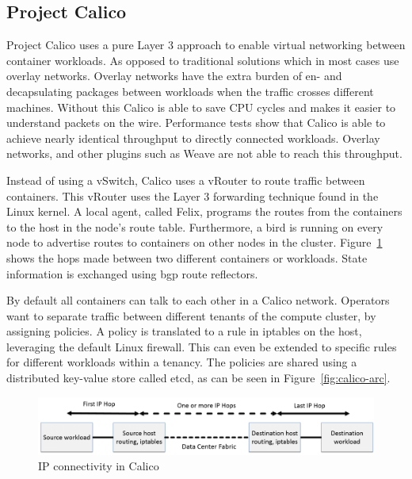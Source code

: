 \subsection{Project Calico}
Project Calico uses a pure Layer 3 approach to enable virtual networking between container workloads. As opposed to traditional solutions which in most cases use overlay networks. Overlay networks have the extra burden of en- and decapsulating packages between workloads when the traffic crosses different machines. Without this Calico is able to save CPU cycles and makes it easier to understand packets on the wire. Performance tests\cite{dzone, dataplane, chunqi} show that Calico is able to achieve nearly identical throughput to directly connected workloads. Overlay networks, and other plugins such as Weave\cite{weave} are not able to reach this throughput.

Instead of using a vSwitch, Calico uses a vRouter to route traffic between containers. This vRouter uses the Layer 3 forwarding technique found in the Linux kernel. A local agent, called Felix, programs the routes from the containers to the host in the node's route table. Furthermore, a \gls{bird} is running on every node to advertise routes to containers on other nodes in the cluster. Figure~\ref{fig:hops} shows the hops made between two different containers or workloads. State information is exchanged using \gls{bgp} route reflectors.

By default all containers can talk to each other in a Calico network. Operators want to separate traffic between different tenants of the compute cluster, by assigning policies. A policy is translated to a rule in iptables\cite{iptables} on the host, leveraging the default Linux firewall. This can even be extended to specific rules for different workloads within a tenancy. The policies are shared using a distributed key-value store called etcd\cite{etcd}, as can be seen in Figure~\ref{fig:calico-arc}.

\begin{figure}
    \centering
    \includegraphics[scale=0.35]{images/calico-hops}
    \caption{IP connectivity in Calico\cite{calico_learn}}
    \label{fig:hops}
\end{figure}

